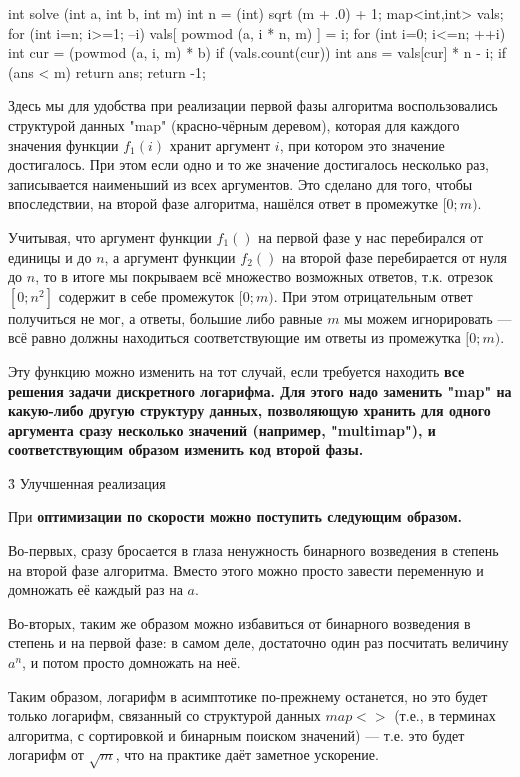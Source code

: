 int solve (int a, int b, int m) {
	int n = (int) sqrt (m + .0) + 1;
	map<int,int> vals;
	for (int i=n; i>=1; --i)
		vals[ powmod (a, i * n, m) ] = i;
	for (int i=0; i<=n; ++i) {
		int cur = (powmod (a, i, m) * b) %
		if (vals.count(cur)) {
			int ans = vals[cur] * n - i;
			if (ans < m)
				return ans;
		}
	}
	return -1;
}
\endcode

Здесь мы для удобства при реализации первой фазы алгоритма воспользовались структурой данных "map" (красно-чёрным деревом), которая для каждого значения функции $f_1(i)$ хранит аргумент $i$, при котором это значение достигалось. При этом если одно и то же значение достигалось несколько раз, записывается наименьший из всех аргументов. Это сделано для того, чтобы впоследствии, на второй фазе алгоритма, нашёлся ответ в промежутке $[0;m)$.

Учитывая, что аргумент функции $f_1()$ на первой фазе у нас перебирался от единицы и до $n$, а аргумент функции $f_2()$ на второй фазе перебирается от нуля до $n$, то в итоге мы покрываем всё множество возможных ответов, т.к. отрезок $[0; n^2]$ содержит в себе промежуток $[0;m)$. При этом отрицательным ответ получиться не мог, а ответы, большие либо равные $m$ мы можем игнорировать --- всё равно должны находиться соответствующие им ответы из промежутка $[0;m)$.

Эту функцию можно изменить на тот случай, если требуется находить \bf{все решения} задачи дискретного логарифма. Для этого надо заменить "map" на какую-либо другую структуру данных, позволяющую хранить для одного аргумента сразу несколько значений (например, "multimap"), и соответствующим образом изменить код второй фазы.


\h3{ Улучшенная реализация }

При \bf{оптимизации по скорости} можно поступить следующим образом.

Во-первых, сразу бросается в глаза ненужность бинарного возведения в степень на второй фазе алгоритма. Вместо этого можно просто завести переменную и домножать её каждый раз на $a$.

Во-вторых, таким же образом можно избавиться от бинарного возведения в степень и на первой фазе: в самом деле, достаточно один раз посчитать величину $a^n$, и потом просто домножать на неё.

Таким образом, логарифм в асимптотике по-прежнему останется, но это будет только логарифм, связанный со структурой данных $map<>$ (т.е., в терминах алгоритма, с сортировкой и бинарным поиском значений) --- т.е. это будет логарифм от $\sqrt{m}$, что на практике даёт заметное ускорение.

